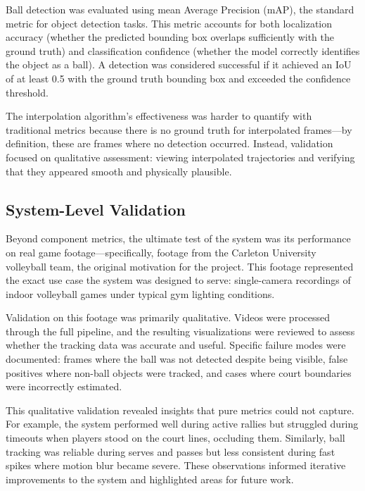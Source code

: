 Ball detection was evaluated using mean Average Precision (mAP), the standard metric for object detection tasks. This metric accounts for both localization accuracy (whether the predicted bounding box overlaps sufficiently with the ground truth) and classification confidence (whether the model correctly identifies the object as a ball). A detection was considered successful if it achieved an IoU of at least 0.5 with the ground truth bounding box and exceeded the confidence threshold.

The interpolation algorithm's effectiveness was harder to quantify with traditional metrics because there is no ground truth for interpolated frames—by definition, these are frames where no detection occurred. Instead, validation focused on qualitative assessment: viewing interpolated trajectories and verifying that they appeared smooth and physically plausible.

\subsection{System-Level Validation}

Beyond component metrics, the ultimate test of the system was its performance on real game footage—specifically, footage from the Carleton University volleyball team, the original motivation for the project. This footage represented the exact use case the system was designed to serve: single-camera recordings of indoor volleyball games under typical gym lighting conditions.

Validation on this footage was primarily qualitative. Videos were processed through the full pipeline, and the resulting visualizations were reviewed to assess whether the tracking data was accurate and useful. Specific failure modes were documented: frames where the ball was not detected despite being visible, false positives where non-ball objects were tracked, and cases where court boundaries were incorrectly estimated.

This qualitative validation revealed insights that pure metrics could not capture. For example, the system performed well during active rallies but struggled during timeouts when players stood on the court lines, occluding them. Similarly, ball tracking was reliable during serves and passes but less consistent during fast spikes where motion blur became severe. These observations informed iterative improvements to the system and highlighted areas for future work.